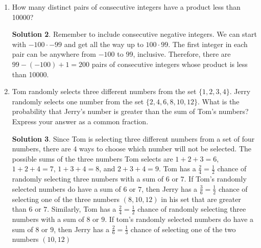 \documentclass{article}
\theoremstyle{definition}
\newtheorem*{solution}{Solution}
\begin{document}
\begin{enumerate}
\begin{enumerate}
\begin{solution}
                    Alternatively, we can compute the perimeter of the fence, 
                    which is $2(60 + 30) = 180$. The fence posts divide this 
                    perimeter into three yard sections, and since the fence is a 
                    cycle, each section corresponds to one fence post.  
                    Therefore, there are $\frac{180}{3} = 60$ fence posts.
                \end{solution}
        \end{enumerate}
    \item How many distinct pairs of consecutive integers have a product less 
        than \num{10000}?
        \begin{solution}
            Remember to include consecutive negative integers. We can start with 
            $-100 \cdot -99$ and get all the way up to $100 \cdot 99$. The first 
            integer in each pair can be anywhere from $-100$ to $99$, inclusive.  
            Therefore, there are $99 - (-100) + 1 = 200$ pairs of consecutive 
            integers whose product is less than \num{10000}.
        \end{solution}
    \item Tom randomly selects three different numbers from the set $\{1, 2, 3, 
        4\}$. Jerry randomly selects one number from the set $\{2, 4, 6, 8 ,10, 
        12\}$. What is the probability that Jerry's number is greater than the 
        sum of Tom's numbers? Express your answer as a common fraction.
        \begin{solution}
            Since Tom is selecting three different numbers from a set of four 
            numbers, there are $4$ ways to choose which number will not be 
            selected. The possible sums of the three numbers Tom selects are $1 
            + 2 + 3 = 6$, $1 + 2 + 4 = 7$, $1 + 3 + 4 = 8$, and $2 + 3 + 4 = 9$. 
            Tom has a $\frac{2}{4} = \frac{1}{2}$ chance of randomly selecting 
            three numbers with a sum of $6$ or $7$. If Tom's randomly selected 
            numbers do have a sum of $6$ or $7$, then Jerry has a $\frac{3}{6} = 
            \frac{1}{2}$ chance of selecting one of the three numbers $(8, 10, 
            12)$ in his set that are greater than $6$ or $7$. Similarly, Tom has 
            a $\frac{2}{4} = \frac{1}{2}$ chance of randomly selecting three 
            numbers with a sum of $8$ or $9$. If tom's randomly selected numbers 
            do have a sum of $8$ or $9$, then Jerry has a $\frac{2}{6} = 
            \frac{1}{3}$ chance of selecting one of the two numbers $(10, 12)$ 

\end{solution}
\end{enumerate}
\end{document}
